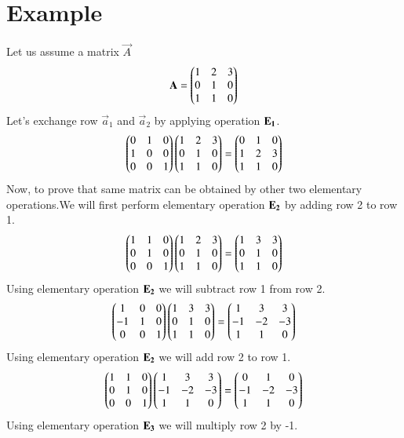 \documentclass[journal,12pt,twocolumn]{IEEEtran}
\begin{document}
  \section{\textbf{Example}}
  Let us assume a matrix $\vec{A}$  
 \begin{align}
 \mathbf{A}=\begin{pmatrix}1&2&3\\0&1&0\\1&1&0\end{pmatrix}
  \end{align}
 Let's exchange row $\vec{a}_1$ and $\vec{a}_2$ by applying operation $\bf{E}_1$.
 \begin{align}
 \begin{pmatrix}0&1&0\\1&0&0\\0&0&1\end{pmatrix}\begin{pmatrix}1&2&3\\0&1&0\\1&1&0\end{pmatrix}=
\begin{pmatrix}0&1&0\\1&2&3\\1&1&0\end{pmatrix}\label{B}
 \end{align}
 Now, to prove that same matrix can be obtained by other two elementary operations.We will first perform elementary operation $\bf{E}_2$ by adding row 2 to row 1.
 \begin{align}
  \begin{pmatrix}1&1&0\\0&1&0\\0&0&1\end{pmatrix}\begin{pmatrix}1&2&3\\0&1&0\\1&1&0\end{pmatrix}=\begin{pmatrix}1&3&3\\0&1&0\\1&1&0\end{pmatrix}
\end{align}
 Using elementary operation $\bf{E}_2$ we will subtract row 1 from row 2.
  \begin{align}
   \begin{pmatrix}1&0&0\\-1&1&0\\0&0&1\end{pmatrix}\begin{pmatrix}1&3&3\\0&1&0\\1&1&0\end{pmatrix}=
\begin{pmatrix}1&3&3\\-1&-2&-3\\1&1&0\end{pmatrix}
 \end{align}
 Using elementary operation $\bf{E}_2$ we will add row 2 to row 1.
  \begin{align}
  \begin{pmatrix}1&1&0\\0&1&0\\0&0&1\end{pmatrix} \begin{pmatrix}1&3&3\\-1&-2&-3\\1&1&0\end{pmatrix}=
\begin{pmatrix}0&1&0\\-1&-2&-3\\1&1&0\end{pmatrix}
 \end{align}
 Using elementary operation $\bf{E}_3$ we will multiply row 2 by -1.
\end{document}
